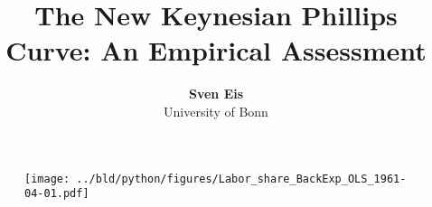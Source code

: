 \documentclass[11pt, aspectratio=169]{beamer}
\begin{document}
\title{The New Keynesian Phillips Curve: An Empirical Assessment}

\author[Sven Eis]
{
{\bf Sven Eis}\\
{\small University of Bonn}\\[1ex]
}


\begin{frame}
    \titlepage
    \note{~}
\end{frame}

\begin{frame}[t]
    \begin{figure}[H]
        \centering
        \texttt{[image: ../bld/python/figures/Labor\_share\_BackExp\_OLS\_1961-04-01.pdf]}
    \end{figure}
\end{frame}

\begin{frame}[t]
    
\end{frame}






 {
    \begin{frame}
        \frametitle{}
    \end{frame}

}

\end{document}
